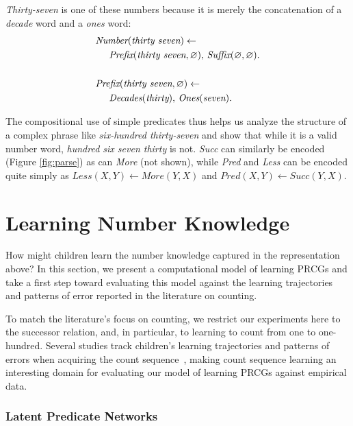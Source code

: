 \documentclass[10pt,letterpaper]{article}
\begin{document}
\noindent\emph{Thirty-seven} is one of these numbers because it is
merely the concatenation of a \emph{decade} word and a \emph{ones}
word:
\begin{align}
  & \textit{Number}(\textit{thirty seven}) \leftarrow\\
  & \hspace{0.5cm} \textit{Prefix}(\textit{thirty seven}, \varnothing),\,\textit{Suffix}(\varnothing,\varnothing).\notag\\
  \notag\\
  & \textit{Prefix}(\textit{thirty seven}, \varnothing) \leftarrow\\
  & \hspace{0.5cm} \textit{Decades}(\textit{thirty}),\,\textit{Ones}(\textit{seven}).\notag
\end{align}


\noindent The compositional use of simple predicates thus helps us
analyze the structure of a complex phrase like \emph{six-hundred
  thirty-seven} and show that while it is a valid number word,
\emph{hundred six seven thirty} is not. \emph{Succ} can similarly
be encoded (Figure \ref{fig:parse}) as can \emph{More} (not shown),
while \emph{Pred} and \emph{Less} can be encoded quite simply
as $\textit{Less}(X,Y) \leftarrow \textit{More}(Y,X)$ and
$\textit{Pred}(X,Y) \leftarrow \textit{Succ}(Y,X)$.

\section{Learning Number Knowledge}

How might children learn the number knowledge captured in the
representation above? In this section, we present a computational
model of learning PRCGs and take a first step toward evaluating this
model against the learning trajectories and patterns of error reported
in the literature on counting.

To match the literature's focus on counting, we restrict our
experiments here to the successor relation, and, in particular, to
learning to count from one to one-hundred. Several studies track
children's learning trajectories and patterns of errors when acquiring
the count sequence~\citep{FusRicBriar1982,miller1987counting}, making
count sequence learning an interesting domain for evaluating our model
of learning PRCGs against empirical data.

\subsubsection{Latent Predicate Networks}
\end{document}
